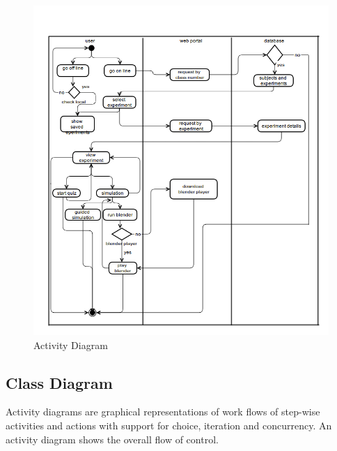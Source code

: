 \documentclass[12pt]{report}
\begin{document}
\begin{figure}[H]
 \centering
 \includegraphics[width=15cm]{./activity.png}
 \caption{Activity Diagram\label{fig:activity}}
\end{figure}

\pagebreak

\subsection{Class Diagram}
Activity diagrams are graphical representations of work flows of step-wise activities 
and actions with support for choice, iteration and concurrency. An activity diagram 
shows the overall flow of control.\\
 
\end{document}
